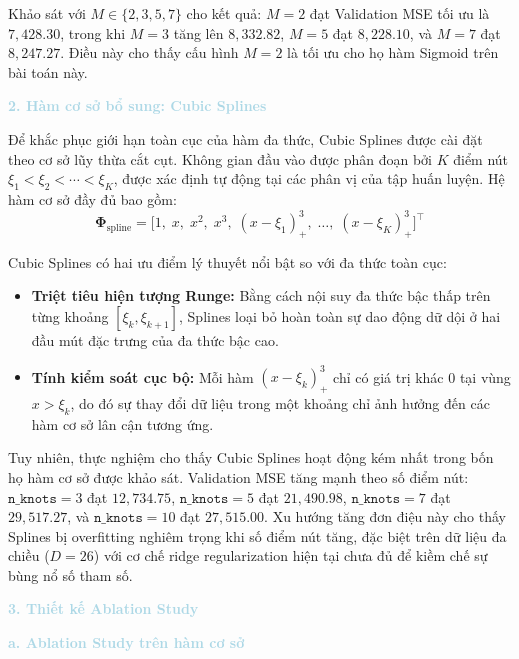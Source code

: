 Khảo sát với $M \in \{2, 3, 5, 7\}$ cho kết quả: $M=2$ đạt Validation MSE
tối ưu là $7{,}428.30$, trong khi $M=3$ tăng lên $8{,}332.82$, $M=5$
đạt $8{,}228.10$, và $M=7$ đạt $8{,}247.27$. Điều này cho thấy cấu hình
$M=2$ là tối ưu cho họ hàm Sigmoid trên bài toán này.

\noindent\textcolor{lightblue}{\textbf{2. Hàm cơ sở bổ sung: Cubic Splines}}

Để khắc phục giới hạn toàn cục của hàm đa thức, Cubic Splines được
cài đặt theo cơ sở lũy thừa cắt cụt. Không gian đầu vào được phân đoạn
bởi $K$ điểm nút $\xi_1 < \xi_2 < \cdots < \xi_K$, được xác định tự động
tại các phân vị của tập huấn luyện. Hệ hàm cơ sở đầy đủ bao gồm:
$$\boldsymbol{\Phi}_{\mathrm{spline}}
  = \bigl[1,\; x,\; x^2,\; x^3,\;
    (x-\xi_1)_+^3,\; \ldots,\; (x-\xi_K)_+^3\bigr]^{\top}$$

Cubic Splines có hai ưu điểm lý thuyết nổi bật so với đa thức toàn cục:
\begin{itemize} [labelsep=10pt, leftmargin=2cm]
    \item \textbf{Triệt tiêu hiện tượng Runge:} Bằng cách nội suy đa thức
    bậc thấp trên từng khoảng $[\xi_k, \xi_{k+1}]$, Splines loại bỏ hoàn
    toàn sự dao động dữ dội ở hai đầu mút đặc trưng của đa thức bậc cao.
    \item \textbf{Tính kiểm soát cục bộ:} Mỗi hàm $(x - \xi_k)_+^3$ chỉ
    có giá trị khác 0 tại vùng $x > \xi_k$, do đó sự thay đổi dữ liệu
    trong một khoảng chỉ ảnh hưởng đến các hàm cơ sở lân cận tương ứng.
\end{itemize}

Tuy nhiên, thực nghiệm cho thấy Cubic Splines hoạt động kém nhất trong
bốn họ hàm cơ sở được khảo sát. Validation MSE tăng mạnh theo số điểm nút:
$\texttt{n\_knots}=3$ đạt $12{,}734.75$, $\texttt{n\_knots}=5$ đạt $21{,}490.98$,
$\texttt{n\_knots}=7$ đạt $29{,}517.27$, và $\texttt{n\_knots}=10$ đạt
$27{,}515.00$. Xu hướng tăng đơn điệu này cho thấy Splines bị overfitting
nghiêm trọng khi số điểm nút tăng, đặc biệt trên dữ liệu đa chiều ($D=26$)
với cơ chế ridge regularization hiện tại chưa đủ để kiềm chế sự bùng nổ
số tham số.

\noindent\textcolor{lightblue}{\textbf{3. Thiết kế Ablation Study}}

\noindent\textcolor{lightblue}{\textbf{a. Ablation Study trên hàm cơ sở}}

